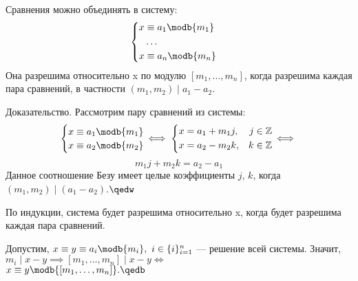 Сравнения можно объединять в {\ital систему}:
$$\begin{cases}
\begin{aligned}
x&\equiv a_1\modb{m_1}\\
&\dots\\
x&\equiv a_n\modb{m_n}
\end{aligned}
\end{cases}$$
Она разрешима относительно {\ital x} по модулю $[m_1,\ldots,m_n]$, когда разрешима каждая пара сравнений, в частности $(m_1,m_2)\mid a_1-a_2$.

{\bold Доказательство.} Рассмотрим пару сравнений из системы:
$$\begin{cases}
x\equiv a_1\modb{m_1}\\
x\equiv a_2\modb{m_2}
\end{cases}
\hspace*{-12pt}\iff
\begin{cases}
\begin{aligned}
x&=a_1+m_1j,& j&\in\mathbb{Z}\\
x&=a_2-m_2k,& k&\in\mathbb{Z}
\end{aligned}
\end{cases}
\hspace*{-12pt}\iff$$
$$m_1j+m_2k=a_2-a_1$$
Данное соотношение Безу имеет целые коэффициенты $j$, $k$, когда $(m_1,m_2)\mid(a_1-a_2)$.$\qedw$

По индукции, система будет разрешима относительно {\ital x}, когда будет разрешима каждая пара сравнений.

Допустим, $x\equiv y\equiv a_i\modb{m_i},\ i\in\{i\}_{i=1}^n$ --- решение всей системы. Значит, $m_i\mid x-y\implies [m_1,\ldots,m_n]\mid x-y\iff$\\$x\equiv y\modb{[m_1,\ldots,m_n]}.\qedb$

